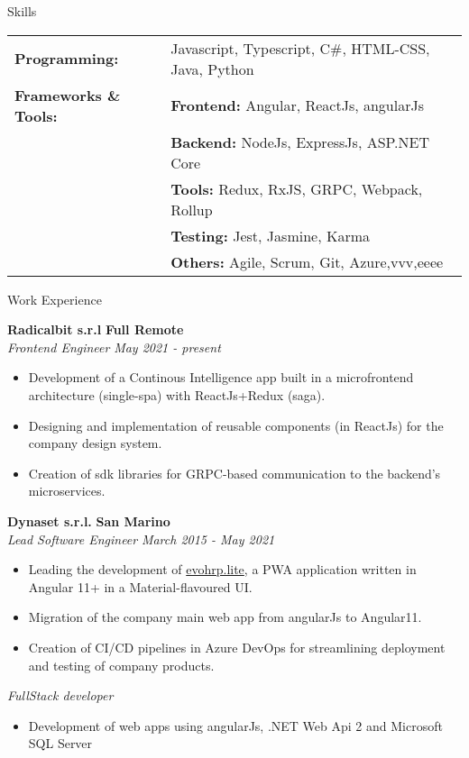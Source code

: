 \documentclass{resume} %
\begin{document}

\begin{rSection}{Skills}

  \begin{tabular}{ @{} >{\bfseries}l @{\hspace{6ex}} l }
  Programming: \ & Javascript, Typescript, C\#, HTML-CSS, Java, Python \\
  Frameworks \& Tools:
  & {\textbf{Frontend: }} Angular, ReactJs, angularJs\\
  & {\textbf{Backend: }} NodeJs, ExpressJs, ASP.NET Core\\
  & {\textbf{Tools: }} Redux, RxJS, GRPC, Webpack, Rollup\\
  & {\textbf{Testing: }} Jest, Jasmine, Karma\\
  & {\textbf{Others: }} Agile, Scrum, Git, Azure,vvv,eeee\\
  \end{tabular}
\end{rSection}


\begin{rSection}{Work Experience}

  {\bf Radicalbit s.r.l} \hfill {\bf Full Remote}
  \\{\textit{Frontend Engineer}} \hfill {\em May 2021 - present}
  \begin{itemize}
    \item Development of a Continous Intelligence app built in a
    microfrontend architecture (single-spa) with ReactJs+Redux (saga).
    \item Designing and implementation of reusable components (in ReactJs) for the
    company design system.
    \item Creation of sdk libraries for GRPC-based communication to the
    backend's microservices.
  \end{itemize}
  {\bf Dynaset s.r.l.} \hfill  {\bf San Marino}
  \\{\textit{Lead Software Engineer}} \hfill {\em  March 2015 - May 2021}
  \begin{itemize}
    \item Leading the development of
    \href{https://evohrplite.app/}{evohrp.lite}, a PWA application written in Angular 11+ in a Material-flavoured UI.
    \item Migration of the company main web app from angularJs to Angular11.
    \item Creation of CI/CD pipelines in Azure DevOps for streamlining deployment and testing of company products.
  \end{itemize}
  {\textit{FullStack developer}}
  \begin{itemize}
    \item Development of web apps using angularJs, .NET Web Api 2 and Microsoft SQL Server
  \end{itemize}
  
\end{rSection}
\end{document}
